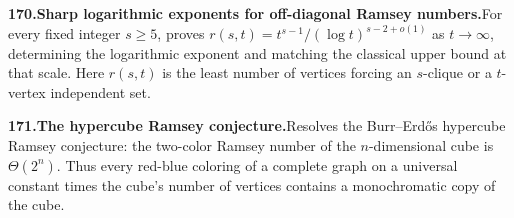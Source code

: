 \documentclass[11pt,a4paper]{article}
\begin{document}
  \par \begin{minipage}{\linewidth}
  \fontsize{10.5}{12.6}\selectfont\RaggedRight
  \hypertarget{result 170}{}
  {\bfseries\textcolor{muted}{170.}\enspace Sharp logarithmic exponents for off-diagonal Ramsey numbers.}\enspace For every fixed integer $s\ge5$, proves $r(s,t)=t^{s-1}/(\log t)^{s-2+o(1)}$ as $t\to\infty$, determining the logarithmic exponent and matching the classical upper bound at that scale. Here $r(s,t)$ is the least number of vertices forcing an $s$-clique or a $t$-vertex independent set.\par
  \end{minipage}\par\vspace{5pt}



  \par \begin{minipage}{\linewidth}
  \fontsize{10.5}{12.6}\selectfont\RaggedRight
  \hypertarget{result 171}{}
  {\bfseries\textcolor{muted}{171.}\enspace The hypercube Ramsey conjecture.}\enspace Resolves the Burr--Erd\H{o}s hypercube Ramsey conjecture: the two-color Ramsey number of the $n$-dimensional cube is $\Theta(2^n)$. Thus every red-blue coloring of a complete graph on a universal constant times the cube's number of vertices contains a monochromatic copy of the cube.\par
  \end{minipage}\par\vspace{5pt}
\end{document}
